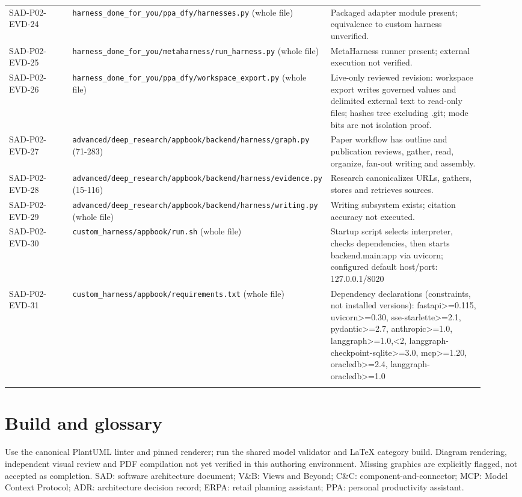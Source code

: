 \documentclass[10pt,letterpaper]{article}
\begin{document}
\begin{longtable}{@{}>{\raggedright\arraybackslash}p{0.17\linewidth}>{\raggedright\arraybackslash}p{0.34\linewidth}>{\raggedright\arraybackslash}p{0.41\linewidth}@{}}
SAD-P02-EVD-24 & \nolinkurl{harness_done_for_you/ppa_dfy/harnesses.py} (whole file) & Packaged adapter module present; equivalence to custom harness unverified.\\\addlinespace
SAD-P02-EVD-25 & \nolinkurl{harness_done_for_you/metaharness/run_harness.py} (whole file) & MetaHarness runner present; external execution not verified.\\\addlinespace
SAD-P02-EVD-26 & \nolinkurl{harness_done_for_you/ppa_dfy/workspace_export.py} (whole file) & Live-only reviewed revision: workspace export writes governed values and delimited external text to read-only files; hashes tree excluding .git; mode bits are not isolation proof.\\\addlinespace
SAD-P02-EVD-27 & \nolinkurl{advanced/deep_research/appbook/backend/harness/graph.py} (71-283) & Paper workflow has outline and publication reviews, gather, read, organize, fan-out writing and assembly.\\\addlinespace
SAD-P02-EVD-28 & \nolinkurl{advanced/deep_research/appbook/backend/harness/evidence.py} (15-116) & Research canonicalizes URLs, gathers, stores and retrieves sources.\\\addlinespace
SAD-P02-EVD-29 & \nolinkurl{advanced/deep_research/appbook/backend/harness/writing.py} (whole file) & Writing subsystem exists; citation accuracy not executed.\\\addlinespace
SAD-P02-EVD-30 & \nolinkurl{custom_harness/appbook/run.sh} (whole file) & Startup script selects interpreter, checks dependencies, then starts backend.main:app via uvicorn; configured default host/port: 127.0.0.1/8020\\\addlinespace
SAD-P02-EVD-31 & \nolinkurl{custom_harness/appbook/requirements.txt} (whole file) & Dependency declarations (constraints, not installed versions): fastapi>=0.115, uvicorn>=0.30, sse-starlette>=2.1, pydantic>=2.7, anthropic>=1.0, langgraph>=1.0,<2, langgraph-checkpoint-sqlite>=3.0, mcp>=1.20, oracledb>=2.4, langgraph-oracledb>=1.0\\\addlinespace
\bottomrule\end{longtable}

\section{Build and glossary}
Use the canonical PlantUML linter and pinned renderer; run the shared model validator and LaTeX category build. Diagram rendering, independent visual review and PDF compilation not yet verified in this authoring environment. Missing graphics are explicitly flagged, not accepted as completion. SAD: software architecture document; V\&B: Views and Beyond; C\&C: component-and-connector; MCP: Model Context Protocol; ADR: architecture decision record; ERPA: retail planning assistant; PPA: personal productivity assistant.
\end{document}
